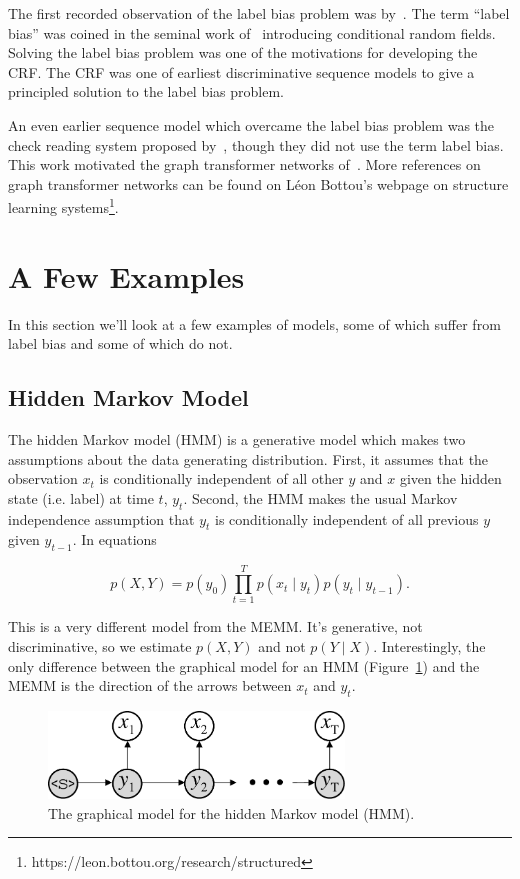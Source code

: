 \documentclass[11pt, letterpaper]{article}
\begin{document}
The first recorded observation of the label bias problem
was by~\citet{bottou1991}. The term ``label bias'' was coined in the seminal work
of~\citet{lafferty2001} introducing conditional random
fields. Solving the label bias problem was one of the
motivations for developing the CRF. The CRF was one of earliest discriminative
sequence models to give a principled solution to the label bias problem.

An even earlier sequence model which overcame the label bias problem was the
check reading system proposed by~\citet{denker1994}, though they did not use
the term label bias. This work motivated the graph transformer networks
of~\citet{bottou1997}. More references on graph transformer networks can be
found on Léon Bottou's webpage on structure learning
systems\footnote{https://leon.bottou.org/research/structured}.

\section{A Few Examples}

In this section we'll look at a few examples of models, some of which suffer
from label bias and some of which do not.

\subsection{Hidden Markov Model}

The hidden Markov model (HMM) is a generative model which makes two assumptions
about the data generating distribution. First, it assumes that the observation
$x_t$ is conditionally independent of all other $y$ and $x$ given the hidden
state (i.e. label) at time $t$, $y_t$. Second, the HMM makes the usual Markov
independence assumption that $y_t$ is conditionally independent of all previous
$y$ given $y_{t-1}$. In equations

\begin{equation}
p(X, Y) = p(y_0) \prod_{t=1}^T p(x_t \mid y_t) p(y_t \mid y_{t-1}).
\end{equation}

This is a very different model from the MEMM. It's generative, not
discriminative, so we estimate $p(X, Y)$ and not $p(Y \mid X)$. Interestingly,
the only difference between the graphical model for an HMM
(Figure~\ref{fig:hmm}) and the MEMM is the direction of the arrows between
$x_t$ and $y_t$.

\begin{figure}
    \centering
    \includegraphics[width=0.7\textwidth]{figures/hmm.pdf}
    \caption{The graphical model for the hidden Markov model (HMM).}
    \label{fig:hmm}
\end{figure}
\end{document}
